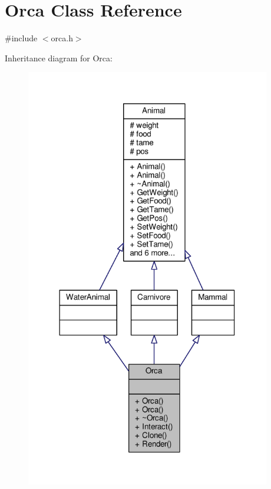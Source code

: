 \hypertarget{classOrca}{}\section{Orca Class Reference}
\label{classOrca}


{\ttfamily \#include $<$orca.\+h$>$}



Inheritance diagram for Orca\+:
\nopagebreak
\begin{figure}[H]
\begin{center}
\leavevmode
\includegraphics[width=303pt]{classOrca__inherit__graph}
\end{center}
\end{figure}


